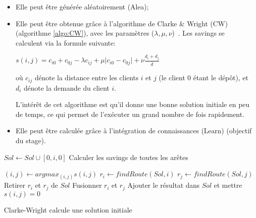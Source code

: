 \documentclass[a4paper,11pt]{article}%
\begin{document}
\begin{itemize}
\item Elle peut être générée aléatoirement (Alea);
\item Elle peut être obtenue grâce à l'algorithme de Clarke \& Wright (CW) (algorithme \ref{algo:CW}), avec les paramètres ($\lambda,\mu,\nu$)~\cite{Altinel_2005}. Les savings se calculent via la formule suivante:

\begin{center}
$s(i,j) = c_{i0} + c_{0j} - \lambda c_{ij} + \mu \vert c_{i0} - c_{0j} \vert + \nu \frac{d_i + d_j}{\overline{d}}$
\end{center}

où $c_{ij}$ dénote la distance entre les clients $i$ et $j$ (le client 0 étant le dépôt), et $d_i$ dénote la demande du client $i$. 

L'intérêt de cet algorithme est qu'il donne une bonne solution initiale en peu de temps, ce qui permet de l'exécuter un grand nombre de fois rapidement.
\item Elle peut être calculée grâce à l'intégration de connaissances (Learn) (objectif du stage).
\end{itemize}

\begin{algorithm}
\DontPrintSemicolon %

 {
	$Sol \gets Sol \cup [0,i,0]$\;
}
Calculer les savings de toutes les arêtes\;

 {
	$(i,j) \gets argmax_{(i,j)} s(i,j)$\;
	$r_i \gets findRoute(Sol,i)$\;
	$r_j \gets findRoute(Sol,j)$\;
	 {
		Retirer $r_i$ et $r_j$ de $Sol$\;
		Fusionner $r_i$ et $r_j$\;
		Ajouter le résultat dans $Sol$ et mettre $s(i,j) = 0$\;
	}
}

\;
\caption{{\sc Clarke-Wright} calcule une solution initiale}
\label{algo:CW}
\end{algorithm}
\end{document}
